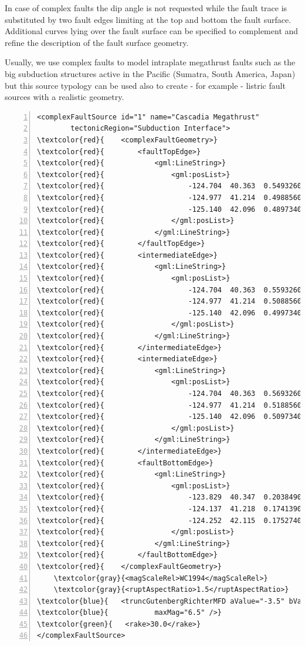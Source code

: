 In case of complex faults the dip angle is not requested while the fault
trace is substituted by two fault edges limiting at the top and bottom 
the fault surface. Additional curves lying over the fault surface can be 
specified to complement and refine the description of the fault surface 
geometry.

Usually, we use complex faults to model intraplate megathrust faults such 
as the big subduction structures active in the Pacific (Sumatra, South 
America, Japan) but this source typology can be used also to create - for
example - listric fault sources with a realistic geometry.
%
\begin{Verbatim}[frame=single, commandchars=\\\{\}, fontsize=\footnotesize,
    numbers=left, numbersep=2pt]
<complexFaultSource id="1" name="Cascadia Megathrust" 
		tectonicRegion="Subduction Interface">
\textcolor{red}{    <complexFaultGeometry>}
\textcolor{red}{        <faultTopEdge>}
\textcolor{red}{            <gml:LineString>}
\textcolor{red}{                <gml:posList>}
\textcolor{red}{                    -124.704  40.363  0.5493260E+01}
\textcolor{red}{                    -124.977  41.214  0.4988560E+01}
\textcolor{red}{                    -125.140  42.096  0.4897340E+01}
\textcolor{red}{                </gml:posList>}
\textcolor{red}{            </gml:LineString>}
\textcolor{red}{        </faultTopEdge>}
\textcolor{red}{        <intermediateEdge>}
\textcolor{red}{            <gml:LineString>}
\textcolor{red}{                <gml:posList>}
\textcolor{red}{                    -124.704  40.363  0.5593260E+01}
\textcolor{red}{                    -124.977  41.214  0.5088560E+01}
\textcolor{red}{                    -125.140  42.096  0.4997340E+01}
\textcolor{red}{                </gml:posList>}
\textcolor{red}{            </gml:LineString>}
\textcolor{red}{        </intermediateEdge>}
\textcolor{red}{        <intermediateEdge>}
\textcolor{red}{            <gml:LineString>}
\textcolor{red}{                <gml:posList>}
\textcolor{red}{                    -124.704  40.363  0.5693260E+01}
\textcolor{red}{                    -124.977  41.214  0.5188560E+01}
\textcolor{red}{                    -125.140  42.096  0.5097340E+01}
\textcolor{red}{                </gml:posList>}
\textcolor{red}{            </gml:LineString>}
\textcolor{red}{        </intermediateEdge>}
\textcolor{red}{        <faultBottomEdge>}
\textcolor{red}{            <gml:LineString>}
\textcolor{red}{                <gml:posList>}
\textcolor{red}{                    -123.829  40.347  0.2038490E+02}
\textcolor{red}{                    -124.137  41.218  0.1741390E+02}
\textcolor{red}{                    -124.252  42.115  0.1752740E+02}
\textcolor{red}{                </gml:posList>}
\textcolor{red}{            </gml:LineString>}
\textcolor{red}{        </faultBottomEdge>}
\textcolor{red}{    </complexFaultGeometry>}
    \textcolor{gray}{<magScaleRel>WC1994</magScaleRel>}
    \textcolor{gray}{<ruptAspectRatio>1.5</ruptAspectRatio>}
\textcolor{blue}{   <truncGutenbergRichterMFD aValue="-3.5" bValue="1.0" minMag="5.0" }
\textcolor{blue}{			maxMag="6.5" />}
\textcolor{green}{   <rake>30.0</rake>}
</complexFaultSource>
\end{Verbatim}
